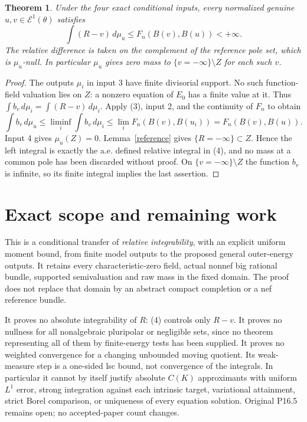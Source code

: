 \documentclass[11pt]{article}
\newtheorem{theorem}{Theorem}
\newcommand{\Eone}{\mathcal E^1}
\begin{document}
\begin{theorem}\label{general}
Under the four exact conditional inputs, every normalized genuine
$u,v\in\Eone(\theta)$ satisfies
\[
      \int(R-v)\,d\mu_u\leq F_n(B(v),B(u))<+\infty.       \tag{4}
\]
The relative difference is taken on the complement of the reference
pole set, which is $\mu_u$-null. In particular $\mu_u$ gives zero mass
to $\{v=-\infty\}\setminus Z$ for each such $v$.
\end{theorem}
\begin{proof}
The outputs $\mu_i$ in input 3 have finite divisorial support. No such
function-field valuation lies on $Z$: a nonzero equation of $E_0$
has a finite value at it. Thus
$\int b_v\,d\mu_i=\int(R-v)\,d\mu_i$. Apply (3), input 2, and the
continuity of $F_n$ to obtain
\[
 \int b_v\,d\mu_u
 \leq\liminf_i\int b_v\,d\mu_i
 \leq\lim_i F_n(B(v),B(u_i))=F_n(B(v),B(u)).
\]
Input 4 gives $\mu_u(Z)=0$. Lemma~\ref{reference} gives
$\{R=-\infty\}\subset Z$. Hence the left integral is exactly the
a.e. defined relative integral in (4), and no mass at a common pole
has been discarded without proof. On $\{v=-\infty\}\setminus Z$
the function $b_v$ is infinite, so its finite integral implies the
last assertion.
\end{proof}

\section{Exact scope and remaining work}
This is a conditional transfer of \emph{relative integrability}, with
an explicit uniform moment bound, from finite model outputs to the
proposed general outer-energy outputs. It retains every characteristic-zero
field, actual nonnef big rational bundle, supported semivaluation and
raw mass in the fixed domain. The proof does not replace that domain
by an abstract compact completion or a nef reference bundle.

It proves no absolute integrability of $R$: (4) controls only $R-v$.
It proves no nullness for all nonalgebraic pluripolar or negligible sets,
since no theorem representing all of them by finite-energy tests has
been supplied. It proves no weighted convergence for a changing
unbounded moving quotient. Its weak-measure step is a one-sided lsc
bound, not convergence of the integrals. In particular it cannot by
itself justify absolute $C(K)$ approximants with uniform $L^1$ error,
strong integration against each intrinsic target, variational attainment,
strict Borel comparison, or uniqueness of every equation solution.
Original P16.5 remains open; no accepted-paper count changes.
\end{document}
